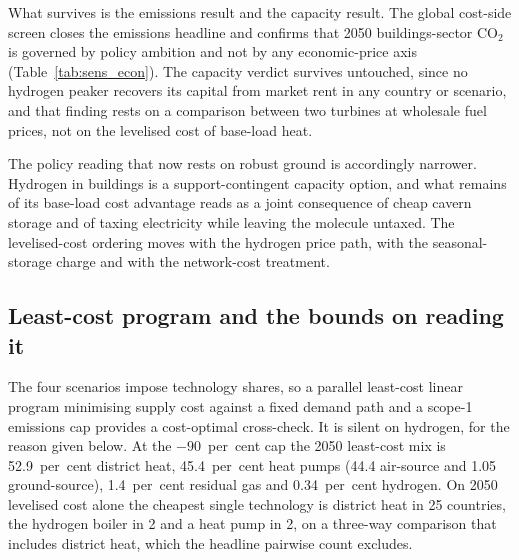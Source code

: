 What survives is the emissions result and the capacity result. The global cost-side screen closes
the emissions headline and confirms that 2050 buildings-sector CO$_2$ is governed
by policy ambition and not by any economic-price axis (Table~\ref{tab:sens_econ}). The
capacity verdict survives untouched, since no hydrogen peaker recovers its capital
from market rent in any country or scenario, and that finding rests on a comparison
between two turbines at wholesale fuel prices, not on the levelised cost of
base-load heat.

The policy reading that now rests on robust ground is accordingly narrower. Hydrogen in buildings is a support-contingent capacity option, and what remains of its base-load cost advantage reads as a joint consequence of cheap cavern
storage and of taxing electricity while leaving the molecule untaxed. The
levelised-cost ordering moves with the hydrogen price path, with the seasonal-storage
charge and with the network-cost treatment.

\subsection{Least-cost program and the bounds on reading it}
\label{sec:results:costopt}

The four scenarios impose technology shares, so a parallel least-cost linear program
minimising supply cost against a fixed demand path and a scope-1 emissions cap provides a
cost-optimal cross-check. It is silent on hydrogen, for the reason given below. At the $-90$~per~cent cap the 2050
least-cost mix is 52.9~per~cent district heat, 45.4~per~cent heat pumps (44.4 air-source
and 1.05 ground-source), 1.4~per~cent residual gas and 0.34~per~cent hydrogen. On 2050
levelised cost alone the cheapest single technology is district heat in 25 countries, the
hydrogen boiler in 2 and a heat pump in 2, on a three-way comparison that includes
district heat, which the headline pairwise count excludes.

